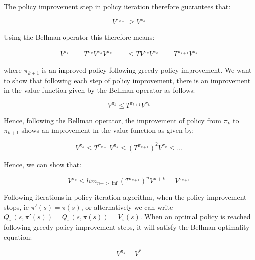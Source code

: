 \documentclass{article}\usepackage[]{graphicx}\usepackage[]{color}
\theoremstyle{plain}
\begin{document}
\noindent
The policy improvement step in policy iteration therefore guarantees that:

\begin{equation}
    V^{\pi_{k+1}} \geq V^{\pi_k}
\end{equation}

\noindent
Using the Bellman operator this therefore means:


\noindent
\begin{equation} \label{eq1}
\begin{split}

V^{\pi_k} & = T^{\pi_k} V^{\pi_k} 

V^{\pi_k} & = \leq T V^{\pi_k} 

V^{\pi_k} & = T^{\pi_{k+1}} V^{\pi_k} 

\end{split}
\end{equation}

\noindent
where $ \pi_{k+1} $ is an improved policy following greedy policy improvement. We want to show that following each step of policy improvement, there is an improvement in the value function given by the Bellman operator as follows:


\begin{equation}
    V^{\pi_k} \leq T^{\pi_{k+1}} V^{\pi_k} 
\end{equation}


\noindent
Hence, following the Bellman operator, the improvement of policy from $\pi_k$ to $\pi_{k+1}$ shows an improvement in the value function as given by:


\begin{equation}
    V^{\pi_k} \leq T^{\pi_{k+1}} V^{\pi_k} \leq ( T^{\pi_{k+1}} )^{2} V^{\pi_k} \leq ...
\end{equation}


\noindent
Hence, we can show that:

\begin{equation}
    V^{\pi_k} \leq lim_{n -> \inf} ( T^{\pi_{k+1}} )^{n} V^{\pi+k} = V^{\pi_{k+1}}
\end{equation}


\noindent
Following iterations in policy iteration algorithm, when the policy improvement stops, ie $\pi'(s) = \pi(s) $, or alternatively we can write $Q_{\pi} (s, \pi'(s)) = Q_{\pi} (s, \pi(s)) = V_{\pi} (s) $. When an optimal policy is reached following greedy policy improvement steps, it will satisfy the Bellman optimality equation:

\begin{equation}
\label{optimal}
    V^{\pi_k} = V^{*}
\end{equation}
\end{document}
